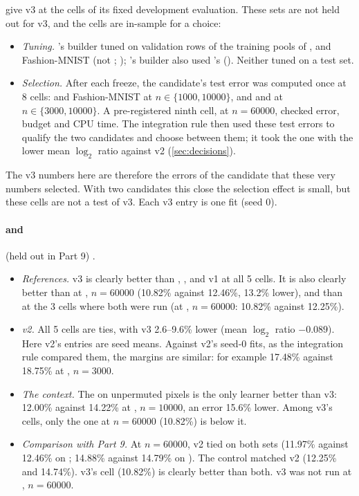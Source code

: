  give v3 at the cells of its fixed development evaluation. These sets are not held out for v3, and the cells are in-sample for a choice:
\begin{itemize}
\item \emph{Tuning.} 's builder tuned on validation rows of the training pools of ,  and Fashion-MNIST (not ; ); 's builder also used 's (). Neither tuned on a test set.
\item \emph{Selection.} After each freeze, the candidate's test error was computed once at 8 cells:  and Fashion-MNIST at $n\in\{1000,10000\}$, and  and  at $n\in\{3000,10000\}$. A pre-registered ninth cell,  at $n=60000$, checked error, budget and CPU time. The integration rule then used these test errors to qualify the two candidates and choose between them; it took the one with the lower mean $\log_2$ ratio against v2 (\cref{sec:decisions}).
\end{itemize}
The v3 numbers here are therefore the errors of the candidate that these very numbers selected. With two candidates this close the selection effect is small, but these cells are not a test of v3. Each v3 entry is one fit (seed 0).

\paragraph{ and } (held out in Part 9) .
\begin{itemize}
\item \emph{References.} v3 is clearly better than , ,  and v1 at all 5 cells. It is also clearly better than  at , $n=60000$ (10.82\% against 12.46\%, 13.2\% lower), and than  at the 3 cells where both were run (at , $n=60000$: 10.82\% against 12.25\%).
\item \emph{v2.} All 5 cells are ties, with v3 2.6--9.6\% lower (mean $\log_2$ ratio $-0.089$). Here v2's entries are seed means. Against v2's seed-0 fits, as the integration rule compared them, the margins are similar: for example 17.48\% against 18.75\% at , $n=3000$.
\item \emph{The context.} The  on unpermuted pixels is the only learner better than v3: 12.00\% against 14.22\% at , $n=10000$, an error 15.6\% lower. Among v3's cells, only the one at $n=60000$ (10.82\%) is below it.
\item \emph{Comparison with Part 9.} At $n=60000$, v2 tied  on both sets (11.97\% against 12.46\% on ; 14.88\% against 14.79\% on ). The control  matched v2 (12.25\% and 14.74\%). v3's  cell (10.82\%) is clearly better than both. v3 was not run at , $n=60000$.
\end{itemize}

